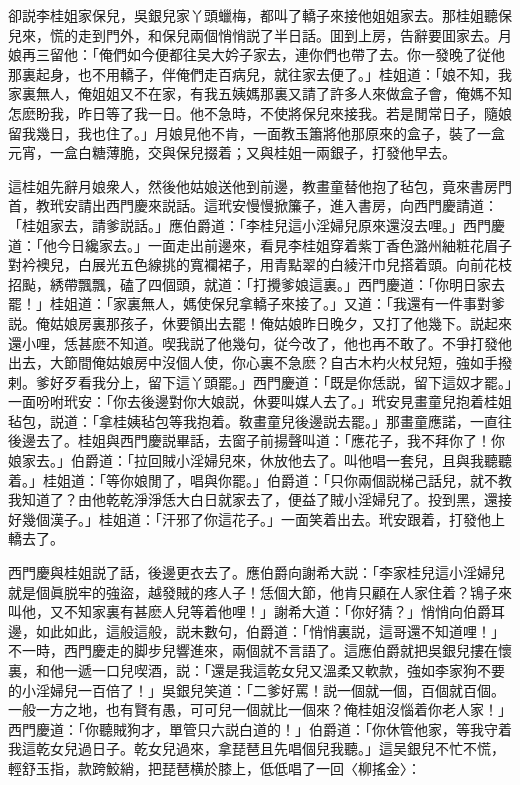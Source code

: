 卻説李桂姐家保兒，吳銀兒家丫頭蠟梅，都叫了轎子來接他姐姐家去。那桂姐聽保兒來，慌的走到門外，和保兒兩個悄悄説了半日話。囬到上房，告辭要囬家去。月娘再三留他：「俺們如今便都往吴大妗子家去，連你們也帶了去。你一發晚了従他那裏起身，也不用轎子，伴俺們走百病兒，就往家去便了。」桂姐道：「娘不知，我家裏無人，俺姐姐又不在家，有我五姨媽那裏又請了許多人來做盒子會，俺媽不知怎麽盼我，昨日等了我一日。他不急時，不使將保兒來接我。若是閒常日子，隨娘留我幾日，我也住了。」月娘見他不肯，一面教玉簫將他那原來的盒子，裝了一盒元宵，一盒白糖薄脆，交與保兒掇着；又與桂姐一兩銀子，打發他早去。

這桂姐先辭月娘衆人，然後他姑娘送他到前邊，教畫童替他抱了毡包，竟來書房門首，教玳安請出西門慶來説話。這玳安慢慢掀簾子，進入書房，向西門慶請道：「桂姐家去，請爹説話。」應伯爵道：「李桂兒這小淫婦兒原來還沒去哩。」西門慶道：「他今日纔家去。」一面走出前邊來，看見李桂姐穿着紫丁香色潞州紬粧花眉子對衿襖兒，白展光五色線挑的寬襴裙子，用青點翠的白綾汗巾兒搭着頭。向前花枝招颭，綉帶飄飄，磕了四個頭，就道：「打攪爹娘這裏。」西門慶道：「你明日家去罷！」桂姐道：「家裏無人，媽使保兒拿轎子來接了。」又道：「我還有一件事對爹説。俺姑娘房裏那孩子，休要領出去罷！俺姑娘昨日晚夕，又打了他幾下。説起來還小哩，恁甚麽不知道。喫我説了他幾句，従今改了，他也再不敢了。不爭打發他出去，大節間俺姑娘房中沒個人使，你心裏不急麽？自古木杓火杖兒短，強如手撥剌。爹好歹看我分上，留下這丫頭罷。」西門慶道：「既是你恁説，留下這奴才罷。」一面吩咐玳安：「你去後邊對你大娘説，休要叫媒人去了。」玳安見畫童兒抱着桂姐毡包，説道：「拿桂姨毡包等我抱着。敎畫童兒後邊説去罷。」那畫童應諾，一直往後邊去了。桂姐與西門慶説畢話，去窗子前揚聲叫道：「應花子，我不拜你了！你娘家去。」伯爵道：「拉回賊小淫婦兒來，休放他去了。叫他唱一套兒，且與我聽聽着。」桂姐道：「等你娘閒了，唱與你罷。」伯爵道：「只你兩個説梯己話兒，就不教我知道了？由他乾乾淨淨恁大白日就家去了，便益了賊小淫婦兒了。投到黑，還接好幾個漢子。」桂姐道：「汗邪了你這花子。」一面笑着出去。玳安跟着，打發他上轎去了。

西門慶與桂姐説了話，後邊更衣去了。應伯爵向謝希大説：「李家桂兒這小淫婦兒就是個眞脱牢的強盜，越發賊的疼人子！恁個大節，他肯只顧在人家住着？鴇子來叫他，又不知家裏有甚麽人兒等着他哩！」謝希大道：「你好猜？」悄悄向伯爵耳邊，如此如此，這般這般，説未數句，伯爵道：「悄悄裏説，這哥還不知道哩！」不一時，西門慶走的脚步兒響進來，兩個就不言語了。這應伯爵就把吳銀兒摟在懷裏，和他一遞一口兒喫酒，説：「還是我這乾女兒又溫柔又軟款，強如李家狗不要的小淫婦兒一百倍了！」吳銀兒笑道：「二爹好罵！説一個就一個，百個就百個。一般一方之地，也有賢有愚，可可兒一個就比一個來？俺桂姐沒惱着你老人家！」西門慶道：「你聽賊狗才，單管只六説白道的！」伯爵道：「你休管他家，等我守着我這乾女兒過日子。乾女兒過來，拿琵琶且先唱個兒我聽。」這吴銀兒不忙不慌，輕舒玉指，款跨鮫綃，把琵琶横於膝上，低低唱了一回〈柳搖金〉：

